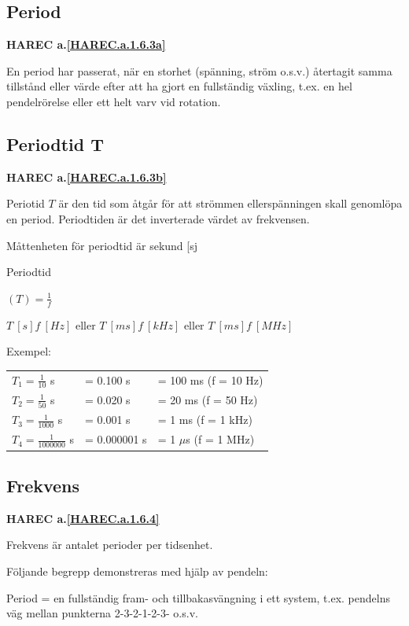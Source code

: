 \subsection{Period}
\textbf{HAREC a.\ref{HAREC.a.1.6.3a}\label{myHAREC.a.1.6.3a}}

En period har passerat, när en storhet (spänning, ström o.s.v.) återtagit samma
tillstånd eller värde efter att ha gjort en fullständig växling, t.ex. en hel
pendelrörelse eller ett helt varv vid rotation.

\subsection{Periodtid T}
\textbf{HAREC a.\ref{HAREC.a.1.6.3b}\label{myHAREC.a.1.6.3b}}

Periotid \(T\) är den tid som åtgår för att strömmen ellerspänningen skall
genomlöpa en period. Periodtiden är det inverterade värdet av frekvensen.

Måttenheten för periodtid är sekund [sj

Periodtid

\((T) = \frac{1}{f}\)

\(T\ [s]  f\ [Hz]\) eller
\(T\ [ms] f\ [kHz]\) eller
\(T\ [ms] f\ [MHz]\)

Exempel:

\begin{center}
\begin{tabular}{lll}
\(T_1=\frac{1}{10}\) s & = 0.100 s & = 100 ms (f = 10 Hz)\\
\(T_2=\frac{1}{50}\) s & = 0.020 s & = 20 ms (f = 50 Hz)\\
\(T_3=\frac{1}{1000}\) s & = 0.001 s & = 1 ms (f = 1 kHz)\\
\(T_4=\frac{1}{1000000}\) s & = 0.000001 s & = 1 \(\mu\)s (f = 1 MHz)\\
\end{tabular}
\end{center}

\subsection{Frekvens}
\textbf{HAREC a.\ref{HAREC.a.1.6.4}\label{myHAREC.a.1.6.4}}

Frekvens är antalet perioder per tidsenhet.

Följande begrepp demonstreras med hjälp av pendeln:

Period = en fullständig fram- och tillbakasvängning i ett system, t.ex.
pendelns väg mellan punkterna 2-3-2-1-2-3- o.s.v.

